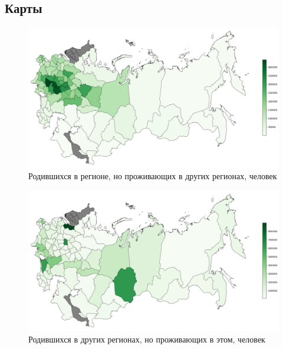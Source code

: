 \documentclass[a4paper,12pt]{article}
\let\oldsection\section
\renewcommand\section{\clearpage\oldsection}
\begin{document}
\begin{landscape}

\section{Карты}

\begin{figure}[h!]
	\includegraphics[height=0.85\textwidth]{mig_from.png}
	\caption{Родившихся в регионе, но проживающих в других регионах, человек}
	\label{fig:from}
\end{figure}
	
\begin{figure}[h!]
	\includegraphics[height=0.85\textwidth]{mig_to.png}
	\caption{Родившихся в других регионах, но проживающих в этом, человек}
	\label{fig:to}
\end{figure}

\end{landscape}
\end{document}
